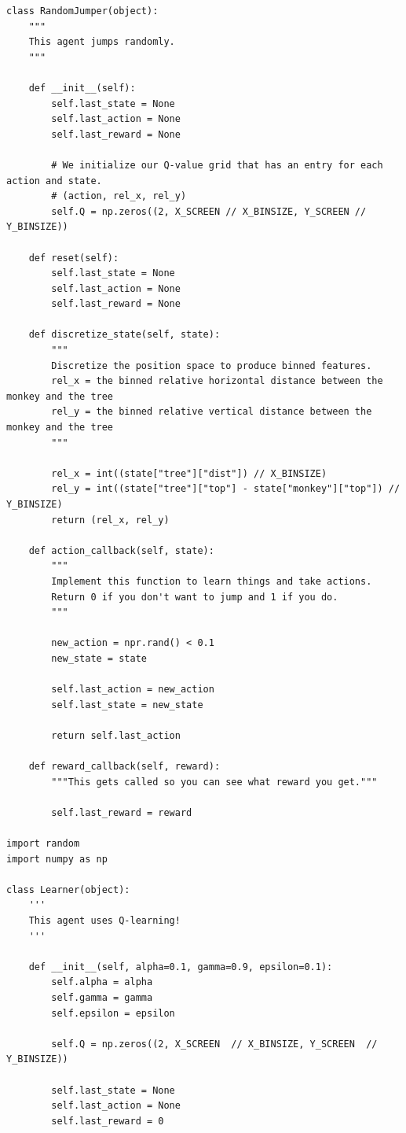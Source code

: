\documentclass[submit]{../harvardml}
\begin{document}
\begin{lstlisting}
class RandomJumper(object):
    """
    This agent jumps randomly.
    """

    def __init__(self):
        self.last_state = None
        self.last_action = None
        self.last_reward = None

        # We initialize our Q-value grid that has an entry for each action and state.
        # (action, rel_x, rel_y)
        self.Q = np.zeros((2, X_SCREEN // X_BINSIZE, Y_SCREEN // Y_BINSIZE))

    def reset(self):
        self.last_state = None
        self.last_action = None
        self.last_reward = None

    def discretize_state(self, state):
        """
        Discretize the position space to produce binned features.
        rel_x = the binned relative horizontal distance between the monkey and the tree
        rel_y = the binned relative vertical distance between the monkey and the tree
        """

        rel_x = int((state["tree"]["dist"]) // X_BINSIZE)
        rel_y = int((state["tree"]["top"] - state["monkey"]["top"]) // Y_BINSIZE)
        return (rel_x, rel_y)

    def action_callback(self, state):
        """
        Implement this function to learn things and take actions.
        Return 0 if you don't want to jump and 1 if you do.
        """

        new_action = npr.rand() < 0.1
        new_state = state

        self.last_action = new_action
        self.last_state = new_state

        return self.last_action

    def reward_callback(self, reward):
        """This gets called so you can see what reward you get."""

        self.last_reward = reward

import random
import numpy as np

class Learner(object):
    '''
    This agent uses Q-learning!
    '''

    def __init__(self, alpha=0.1, gamma=0.9, epsilon=0.1):
        self.alpha = alpha
        self.gamma = gamma
        self.epsilon = epsilon

        self.Q = np.zeros((2, X_SCREEN  // X_BINSIZE, Y_SCREEN  // Y_BINSIZE))

        self.last_state = None
        self.last_action = None
        self.last_reward = 0
        

\end{lstlisting}
\end{document}
